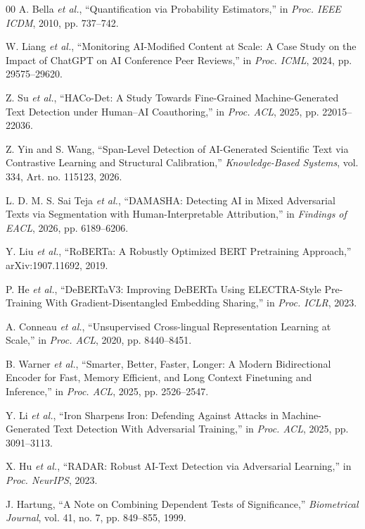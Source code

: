 \documentclass[10pt,conference,a4paper]{IEEEtran}
\begin{document}
\begin{thebibliography}{00}
A. Bella \textit{et al.}, ``Quantification via Probability Estimators,'' in
\textit{Proc. IEEE ICDM}, 2010, pp. 737--742.

W. Liang \textit{et al.}, ``Monitoring AI-Modified Content at Scale: A Case Study on
the Impact of ChatGPT on AI Conference Peer Reviews,'' in \textit{Proc. ICML}, 2024, pp. 29575--29620.

Z. Su \textit{et al.}, ``HACo-Det: A Study Towards Fine-Grained Machine-Generated Text
Detection under Human--AI Coauthoring,'' in \textit{Proc. ACL}, 2025, pp. 22015--22036.

Z. Yin and S. Wang, ``Span-Level Detection of AI-Generated Scientific Text via
Contrastive Learning and Structural Calibration,'' \textit{Knowledge-Based Systems},
vol. 334, Art. no. 115123, 2026.

L. D. M. S. Sai Teja \textit{et al.}, ``DAMASHA: Detecting AI in Mixed Adversarial Texts
via Segmentation with Human-Interpretable Attribution,'' in \textit{Findings of EACL},
2026, pp. 6189--6206.

Y. Liu \textit{et al.}, ``RoBERTa: A Robustly Optimized BERT Pretraining
Approach,'' arXiv:1907.11692, 2019.

P. He \textit{et al.}, ``DeBERTaV3: Improving DeBERTa Using ELECTRA-Style Pre-Training
With Gradient-Disentangled Embedding Sharing,'' in \textit{Proc. ICLR}, 2023.

A. Conneau \textit{et al.}, ``Unsupervised Cross-lingual Representation Learning at
Scale,'' in \textit{Proc. ACL}, 2020, pp. 8440--8451.

B. Warner \textit{et al.}, ``Smarter, Better, Faster, Longer: A Modern Bidirectional
Encoder for Fast, Memory Efficient, and Long Context Finetuning and Inference,'' in
\textit{Proc. ACL}, 2025, pp. 2526--2547.

Y. Li \textit{et al.}, ``Iron Sharpens Iron: Defending Against Attacks in
Machine-Generated Text Detection With Adversarial Training,'' in \textit{Proc. ACL},
2025, pp. 3091--3113.

X. Hu \textit{et al.}, ``RADAR: Robust AI-Text Detection via Adversarial Learning,'' in
\textit{Proc. NeurIPS}, 2023.

J. Hartung, ``A Note on Combining Dependent Tests of Significance,'' \textit{Biometrical
Journal}, vol. 41, no. 7, pp. 849--855, 1999.

\end{thebibliography}
\end{document}
